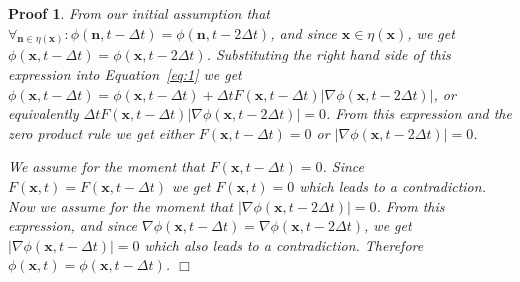 \documentclass{egpubl}
\newcommand{\qed}{\hfill \ensuremath{\Box}}
\newtheorem{pro}{Proof}
\begin{document}
{{\begin{pro}
\medskip

From our initial assumption that ${\forall }_{{\mathbf n}\in \eta \left({\mathbf x}\right)}:\phi\left({\mathbf n},t-\Delta t\right)=\phi({\mathbf n},t-2\Delta t)$, and since ${\mathbf x}\in \eta \left({\mathbf x}\right)$, we get $\phi\left({\mathbf x},t-\Delta t\right)=\phi({\mathbf x},t-2\Delta t)$. Substituting the right hand side of this expression into Equation~\ref{eq:1} we get $\phi\left({\mathbf x},t-\Delta t\right)=\phi\left({\mathbf x},t-\Delta t\right)+\Delta tF\left({\mathbf x},t-\Delta t\right)\left|\nabla \phi\left({\mathbf x},t-2\Delta t\right)\right|$, or equivalently $\Delta tF\left({\mathbf x},t-\Delta t\right)\left|\nabla \phi\left({\mathbf x},t-2\Delta t\right)\right|=0$. From this expression and the zero product rule we get either $F\left({\mathbf x},t-\Delta t\right)=0$ or $\left|\nabla \phi\left({\mathbf x},t-2\Delta t\right)\right|=0$.

\medskip

We assume for the moment that $F\left({\mathbf x},t-\Delta t\right)=0$. Since $F\left({\mathbf x},t\right)=F\left({\mathbf x},t-\Delta t\right)$ we get $F\left({\mathbf x},t\right)=0$ which leads to a contradiction. Now we assume for the moment that $\left|\nabla \phi\left({\mathbf x},t-2\Delta t\right)\right|=0$. From this expression, and since $\nabla \phi\left({\mathbf x},t - \Delta t\right) = \nabla \phi\left({\mathbf x},t - 2 \Delta t\right)$, we get $\left|\nabla \phi\left({\mathbf x},t-\Delta t\right)\right|=0$ which also leads to a contradiction. Therefore $\phi\left({\mathbf x},t\right)=\phi\left({\mathbf x},t-\Delta t\right)$. \qed

\end{pro}




}}
\end{document}
